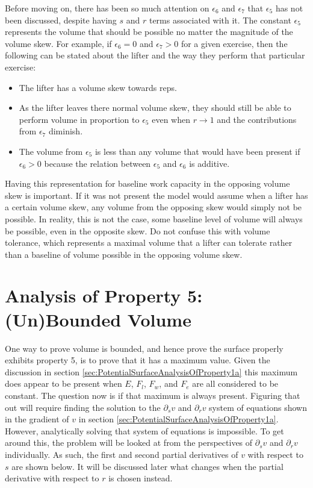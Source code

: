 Before moving on, there has been so much attention on $\epsilon_6$ and $\epsilon_7$ that $\epsilon_5$ has not been discussed, despite having $s$ and $r$ terms associated with it. The constant $\epsilon_5$ represents the volume that should be possible no matter the magnitude of the volume skew. For example, if $\epsilon_6=0$ and $\epsilon_7>0$ for a given exercise, then the following can be stated about the lifter and the way they perform that particular exercise:

\begin{itemize}
    \item The lifter has a volume skew towards reps.
    \item As the lifter leaves there normal volume skew, they should still be able to perform volume in proportion to $\epsilon_5$ even when $r\to 1$ and the contributions from $\epsilon_7$ diminish.
    \item The volume from $\epsilon_5$ is less than any volume that would have been present if $\epsilon_6>0$ because the relation between $\epsilon_5$ and $\epsilon_6$ is additive.
\end{itemize}

Having this representation for baseline work capacity in the opposing volume skew is important. If it was not present the model would assume when a lifter has a certain volume skew, any volume from the opposing skew would simply not be possible. In reality, this is not the case, some baseline level of volume will always be possible, even in the opposite skew. Do not confuse this with volume tolerance, which represents a maximal volume that a lifter can tolerate rather than a baseline of volume possible in the opposing volume skew.

\section{Analysis of Property 5: (Un)Bounded Volume}
\label{sec:PotentialSurfaceUnboundedVolume}

One way to prove volume is bounded, and hence prove the surface properly exhibits property 5, is to prove that it has a maximum value. Given the discussion in section \ref{sec:PotentialSurfaceAnalysisOfProperty1a} this maximum does appear to be present when $E$, $F_l$, $F_w$, and $F_e$ are all considered to be constant. The question now is if that maximum is always present. Figuring that out will require finding the solution to the $\partial_sv$ and $\partial_rv$ system of equations shown in the gradient of $v$ in section \ref{sec:PotentialSurfaceAnalysisOfProperty1a}. However, analytically solving that system of equations is impossible. To get around this, the problem will be looked at from the perspectives of $\partial_sv$ and $\partial_rv$ individually. As such, the first and second partial derivatives of $v$ with respect to $s$ are shown below. It will be discussed later what changes when the partial derivative with respect to $r$ is chosen instead.

